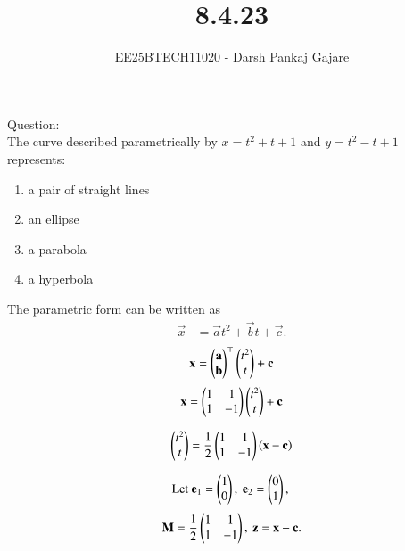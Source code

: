 \documentclass[journal,12pt,onecolumn]{IEEEtran}
\begin{document}
\title{8.4.23}
\author{EE25BTECH11020 - Darsh Pankaj Gajare}
{\let\newpage\relax\maketitle}

Question:\\
The curve described parametrically by $x=t^2+t+1$ and $y=t^2-t+1$ represents:

\begin{multicols}{4}
\begin{enumerate}
\item a pair of straight lines
\item an ellipse
\item a parabola
\item a hyperbola
\end{enumerate}
\end{multicols}

\solution
\begin{table}[H]
	\centering
	\caption{}
	
	\label{}
\end{table}

The parametric form can be written as
\begin{align}
\vec{x} &= \vec{a}t^2 + \vec{b}t + \vec{c}.
\end{align}
\begin{align}
	\mathbf{x}=\begin{pmatrix}\mathbf{a}\\\mathbf{b}\end{pmatrix}^\top\begin{pmatrix}t^2\\t\end{pmatrix}+\mathbf{c}
\end{align}
\begin{align}
\mathbf{x}=\begin{pmatrix}1 & 1\\ 1 & -1\end{pmatrix}\begin{pmatrix}t^2\\ t\end{pmatrix}+\mathbf{c}
\end{align}

\begin{align}
\begin{pmatrix}t^2\\ t\end{pmatrix}=\frac{1}{2}\begin{pmatrix}1 & 1\\ 1 & -1\end{pmatrix}
\left(\mathbf{x}-\mathbf{c}\right)
\end{align}

\begin{align}
\text{Let } \vec{e}_1=\myvec{1\\ 0},\ \vec{e}_2=\myvec{0\\ 1},\ 
\end{align}
\begin{align}
	\vec{M}=\frac{1}{2}\myvec{1 & 1\\ 1 & -1},\ 
\vec{z}=\vec{x}-\vec{c}. 
\end{align}
\end{document}

